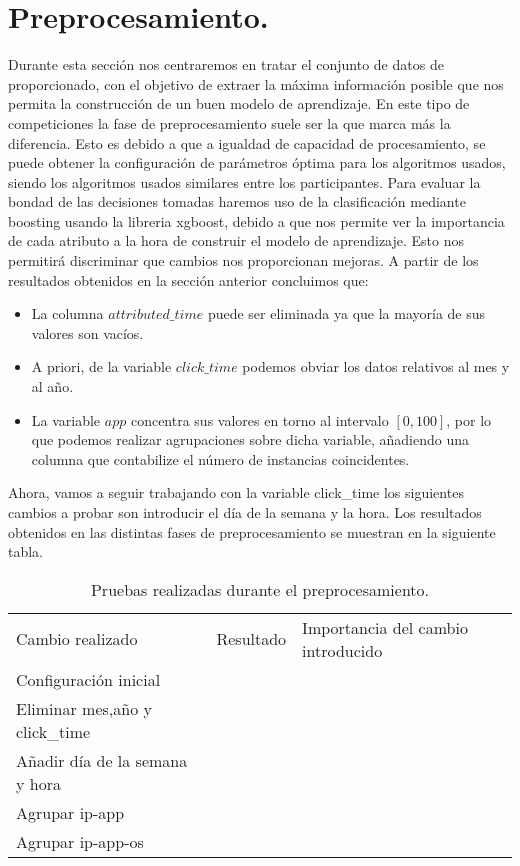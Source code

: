 \chapter{Preprocesamiento.}
Durante esta sección nos centraremos en tratar el conjunto de datos de proporcionado, con el objetivo de extraer la máxima información posible que nos permita la construcción de un buen modelo de aprendizaje.
En este tipo de competiciones la fase de preprocesamiento suele ser la que marca más la diferencia. Esto es debido a que a igualdad de capacidad de procesamiento, se puede obtener la configuración de parámetros óptima para los algoritmos usados, siendo los algoritmos usados similares entre los participantes.
\medskip
Para evaluar la bondad de las decisiones tomadas haremos uso de la clasificación mediante boosting usando la libreria xgboost, debido a que nos permite ver la importancia de cada atributo a la hora de construir el modelo de aprendizaje. Esto nos permitirá discriminar que cambios nos proporcionan mejoras.
\medskip
A partir de los resultados obtenidos en la sección anterior concluimos que:
\begin{itemize}
	\item La columna $attributed\_time$ puede ser eliminada ya que la mayoría de sus valores son vacíos.
	\item A priori, de la variable $click\_time$ podemos obviar los datos relativos al mes y al año.
	\item La variable $app$ concentra sus valores en torno al intervalo $[0,100]$, por lo que podemos realizar agrupaciones sobre dicha variable, añadiendo una columna que contabilize el número de instancias coincidentes.
\end{itemize}
Ahora, vamos a  seguir trabajando con la variable click\_time los siguientes cambios a probar son introducir el día de la semana y la hora.
Los resultados obtenidos en las distintas fases de preprocesamiento se muestran en la siguiente tabla.
\begin{table}[]
	\centering
	
	\begin{tabular}{lll}
		Cambio realizado& Resultado & Importancia del cambio introducido  \\
		Configuración inicial&  &   \\
		Eliminar mes,año y click\_time&  & \\
		Añadir día de la semana y hora&  & \\
		Agrupar ip-app & & \\
		Agrupar ip-app-os & & \\  
	\end{tabular}
\caption{Pruebas realizadas durante el preprocesamiento.}
\end{table}